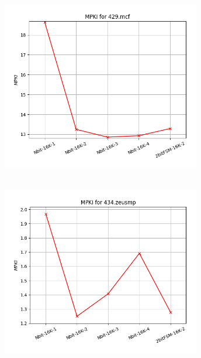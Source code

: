    \begin{minipage}{\textwidth}
      \begin{center}
         \\
         \vspace{3mm}
         \includegraphics[width=0.65\textwidth, frame]{./graphs/4-2i/429-mcf.png}
         \vspace{6mm}
      \end{center}
   \end{minipage}

   \begin{minipage}{\textwidth}
      \begin{center}
         \\
         \vspace{3mm}
         \includegraphics[width=0.65\textwidth, frame]{./graphs/4-2i/434-zeusmp.png}
         \vspace{6mm}
      \end{center}
   \end{minipage}

